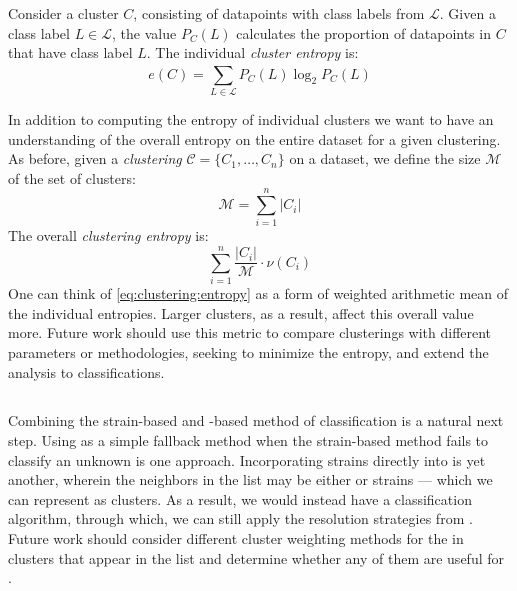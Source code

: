 Consider a cluster $C$, consisting of datapoints with class labels from $\mathcal{L}$.
Given a class label $L\in\mathcal{L}$, the value $P_C(L)$ calculates the proportion of datapoints in $C$ that have class label $L$.
The individual \textit{cluster entropy} is:
\begin{equation}
e(C) = \sum_{L\in\mathcal{L}}^{} P_C(L)\log_2{P_C(L)}
\end{equation}

In addition to computing the entropy of individual clusters we want to have an understanding of the overall entropy on the entire dataset for a given clustering.
As before, given a \textit{clustering} $\mathcal{C} = \{C_1,\dots,C_n\}$ on a dataset, we define the size $\mathcal{M}$ of the set of clusters: 
\begin{equation}
\mathcal{M} = \sum_{i = 1}^{n} |C_i|
\end{equation}
The overall \textit{clustering entropy} is:
\begin{equation}\label{eq:clustering:entropy}
\sum_{i=1}^{n} \frac{|C_i|}{\mathcal{M}}\cdot\nu(C_i)
\end{equation}
One can think of \eqref{eq:clustering:entropy} as a form of weighted arithmetic mean of the individual entropies.
Larger clusters, as a result, affect this overall value more.
Future work should use this metric to compare clusterings with different parameters or methodologies, seeking to minimize the entropy, and extend the analysis to \krap{} classifications.

\subsection{\kNClong{}}
Combining the strain-based and \isol{}-based method of classification is a natural next step.
Using \krap{} as a simple fallback method when the strain-based method fails to classify an unknown \spec{} \isol{} is one approach.
Incorporating strains directly into \krap{} is yet another, wherein the neighbors in the \knnlong{} list may be either \isols{} or strains --- which we can represent as clusters.
As a result, we would instead have a \kNClong{} classification algorithm, through which, we can still apply the resolution strategies from \krap{}.
Future work should consider different cluster weighting methods for the \spec{} in clusters that appear in the \knnlong{} list and determine whether any of them are useful for \mst{}.

